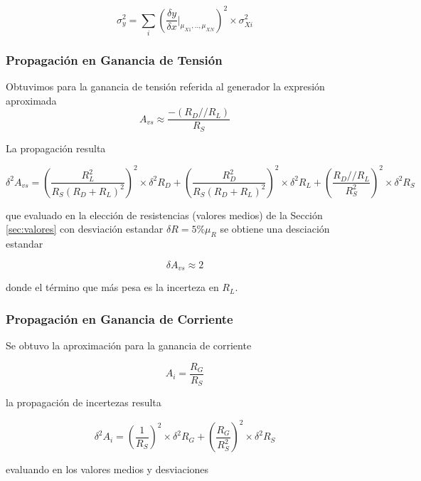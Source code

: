 \documentclass[a4paper, 10pt, spanish]{article}
\begin{document}
\begin{equation}
	\sigma_y^2 = \sum_{i}^{} (\frac{\delta y}{\delta x} \rvert_{\mu_{X1},..,\mu_{XN}})^2 \times \sigma_{Xi}^2 \nonumber
	\end{equation}

\subsubsection{Propagación en Ganancia de Tensión}

Obtuvimos para la ganancia de tensión referida al generador la expresión aproximada
\begin{equation}
	A_{vs} \approx \frac{-(R_D//R_L)}{R_S} \nonumber
	\end{equation}

La propagación resulta

\begin{equation}
	\delta^2 A_{vs} = (\frac{R_L^2}{R_S(R_D+R_L)^2})^2 \times \delta^2 R_D + (\frac{R_D^2}{R_S(R_D+R_L)^2})^2 \times \delta^2R_L + (\frac{R_D//R_L}{R_S^2})^2\times \delta^2R_S \nonumber
	\end{equation}

que evaluado en la elección de resistencias (valores medios) de la Sección \ref{sec:valores} con desviación estandar $\delta R = 5\% \mu_R$ se obtiene una desciación estandar

\begin{equation}
	\delta A_{vs} \approx 2 \nonumber
	\end{equation}

donde el término que más pesa es la incerteza en $R_L$.


\subsubsection{Propagación en Ganancia de Corriente}

Se obtuvo la aproximación para la ganancia de corriente

\begin{equation}
	A_i = \frac{R_G}{R_S} \nonumber
	\end{equation}

la propagación de incertezas resulta

\begin{equation}
	\delta^2 A_i = (\frac{1}{R_S})^2 \times \delta^2 R_G + (\frac{R_G}{R_S^2})^2 \times \delta^2 R_S \nonumber
	\end{equation}

evaluando en los valores medios y desviaciones
\end{document}
